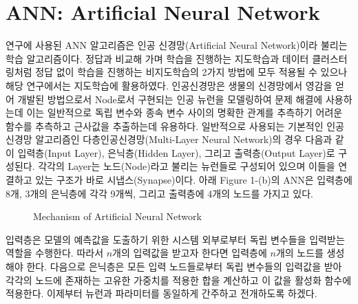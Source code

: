 \documentclass{article}
\begin{document}
\section{ANN: Artificial Neural Network}
연구에 사용된 ANN 알고리즘은 인공 신경망(Artificial Neural Network)이라 불리는 학습 알고리즘이다. 정답과 비교해 가며 학습을 진행하는 지도학습과 데이터 클러스터링처럼 정답 없이 학습을 진행하는 비지도학습의 2가지 방법에 모두 적용될 수 있으나 해당 연구에서는 지도학습에 활용하였다. 인공신경망은 생물의 신경망에서 영감을 얻어 개발된 방법으로서 Node로서 구현되는 인공 뉴런을 모델링하여 문제 해결에 사용하는데 이는 일반적으로 독립 변수와 종속 변수 사이의 명확한 관계를 추측하기 어려운 함수를 추측하고 근사값을 추출하는데 유용하다. \newline
일반적으로 사용되는 기본적인 인공신경망 알고리즘인 다층인공신경망(Multi-Layer Neural Network)의 경우 다음과 같이 입력층(Input Layer), 은닉층(Hidden Layer), 그리고 출력층(Output Layer)로 구성된다. 각각의 Layer는 노드(Node)라고 불리는 뉴런들로 구성되어 있으며 이들을 연결하고 있는 구조가 바로 시냅스(Synapse)이다. 아래 Figure 1-(b)의 ANN은 입력층에 8개, 3개의 은닉층에 각각 9개씩, 그리고 출력층에 4개의 노드를 가지고 있다.

\begin{figure}[h]
\centering
{}
\caption{Mechanism of Artificial Neural Network}
\end{figure}

입력층은 모델의 예측값을 도출하기 위한 시스템 외부로부터 독립 변수들을 입력받는 역할을 수행한다. 따라서 $n$개의 입력값을 받고자 한다면 입력층에 $n$개의 노드를 생성해야 한다. 다음으로 은닉층은 모든 입력 노드들로부터 독립 변수들의 입력값을 받아 각각의 노드에 존재하는 고유한 가중치를 적용한 합을 계산하고 이 값을 활성화 함수에 적용한다. 이제부터 뉴런과 파라미터를 동일하게 간주하고 전개하도록 하겠다.
\end{document}

